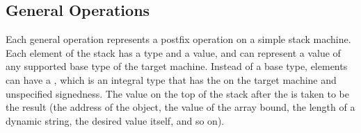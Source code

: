 \subsection{General Operations}
\label{chap:generaloperations}
Each general operation represents a postfix operation on
a simple stack machine. 
Each element of the stack has a type and a value, and can represent
a value of any supported base type of the target machine.  Instead of
a base type, elements can have a 
,
which is an integral type that has the 
 on the target machine and 
unspecified signedness. The value on the top of the stack after 
 the 
is 
taken to be the result (the address of the object, the
value of the array bound, the length of a dynamic string,
the desired value itself, and so on).

\bbpareb


